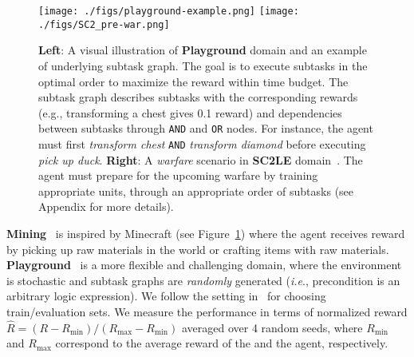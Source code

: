 \documentclass{article} \usepackage{iclr2020_conference,times}
\makeatletter
\newcommand{\tb}{\textbf}
\DeclareRobustCommand\onedot{\futurelet\@let@token\@onedot}
\def\onedot{.}
\def\ie{\emph{i.e}\onedot} \def\Ie{\emph{I.e}\onedot}
\makeatother
\begin{document}
\begin{figure}[!t]
    \centering
    \texttt{[image: ./figs/playground-example.png]}\hfill
    \texttt{[image: ./figs/SC2\_pre-war.png]}\caption{\textbf{Left}: A visual illustration of \textbf{Playground} domain and an example of underlying subtask graph.
        The goal is to execute subtasks in the optimal order to maximize the reward within time budget.
        The subtask graph describes subtasks with the corresponding rewards (e.g., transforming a chest gives 0.1 reward) and dependencies between subtasks through \texttt{AND} and \texttt{OR} nodes.
        For instance, the agent must first \textit{transform chest} \texttt{AND} \textit{transform diamond} before executing \textit{pick up duck}.
        \textbf{Right}: A \emph{warfare} scenario in \textbf{SC2LE} domain~\citep{vinyals2017starcraft}.
        The agent must prepare for the upcoming warfare by training appropriate units,
        through an appropriate order of subtasks (see Appendix for more details).
    }
    \label{fig:domain_examples}
    \vspace{-7pt}
\end{figure}







\tb{Mining}~\citep{sohn2018hierarchical} is inspired by Minecraft (see Figure~\ref{fig:domain_examples})
where the agent receives reward by picking up raw materials in the world or crafting items with raw materials.
\tb{Playground}~\citep{sohn2018hierarchical} is a more flexible and challenging domain,
where the environment is stochastic and subtask graphs are \emph{randomly} generated (\ie, precondition is an arbitrary logic expression).
We follow the setting in~\citet{sohn2018hierarchical} for choosing train/evaluation sets.
We measure the performance in terms of normalized reward $\widehat{R}=(R-R_\text{min})/(R_\text{max}-R_\text{min})$ averaged over 4 random seeds,
where $R_\text{min}$ and $R_\text{max}$ correspond to the average reward of the \Random and the \GRPropOracle agent, respectively.
\end{document}
